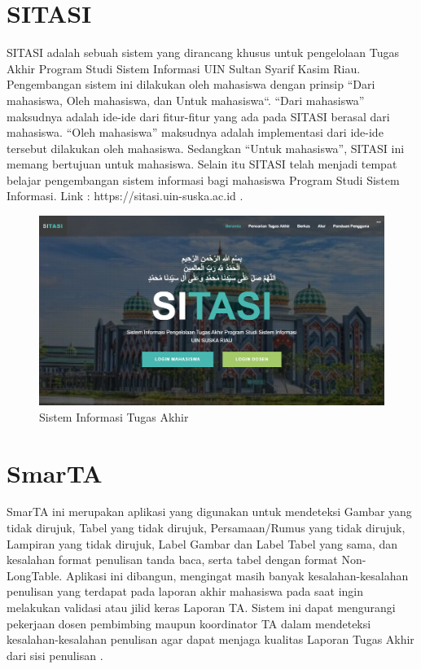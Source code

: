 \section{SITASI}
SITASI adalah sebuah sistem yang dirancang khusus untuk pengelolaan Tugas Akhir Program Studi Sistem Informasi UIN Sultan Syarif Kasim Riau. Pengembangan sistem ini dilakukan oleh mahasiswa dengan prinsip “Dari mahasiswa, Oleh mahasiswa, dan Untuk mahasiswa“. “Dari mahasiswa” maksudnya adalah ide-ide dari fitur-fitur yang ada pada SITASI berasal dari mahasiswa. “Oleh mahasiswa” maksudnya adalah implementasi dari ide-ide tersebut dilakukan oleh mahasiswa. Sedangkan “Untuk mahasiswa”, SITASI ini memang bertujuan untuk mahasiswa. Selain itu SITASI telah menjadi tempat belajar pengembangan sistem informasi bagi mahasiswa Program Studi Sistem Informasi. Link : https://sitasi.uin-suska.ac.id \cite{web-prodi}.

\begin{figure}
	\centering
	\includegraphics[width=0.82\linewidth]{konten//gambar/sitasi.png}
	\caption{Sistem Informasi Tugas Akhir \protect\cite{web-prodi}}
	\label{fig:enter-label}
\end{figure}

\section{SmarTA}
SmarTA ini merupakan aplikasi yang digunakan untuk mendeteksi Gambar yang tidak dirujuk, Tabel yang tidak dirujuk, Persamaan/Rumus yang tidak dirujuk, Lampiran yang tidak dirujuk, Label Gambar dan Label Tabel yang sama, dan kesalahan format penulisan tanda baca, serta tabel dengan format Non-LongTable. Aplikasi ini dibangun, mengingat masih banyak kesalahan-kesalahan penulisan yang terdapat pada laporan akhir mahasiswa pada saat ingin melakukan validasi atau jilid keras Laporan TA. Sistem ini dapat mengurangi pekerjaan dosen pembimbing maupun koordinator TA dalam mendeteksi kesalahan-kesalahan penulisan agar dapat menjaga kualitas Laporan Tugas Akhir dari sisi penulisan \cite{web-prodi}.

